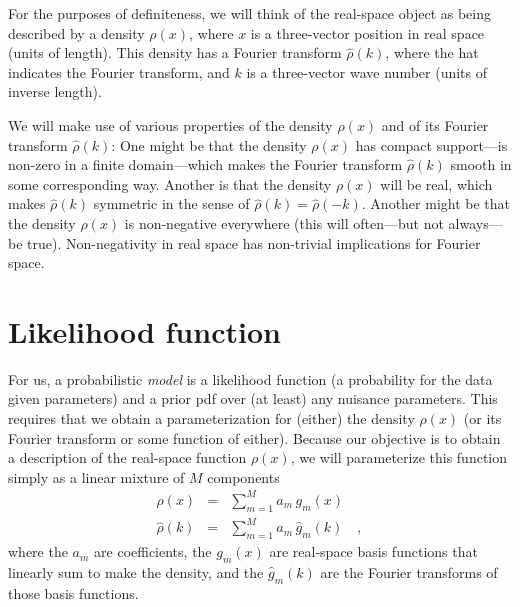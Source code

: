 \documentclass[12pt]{article}
\begin{document}
For the purposes of definiteness, we will think of the real-space
object as being described by a density $\rho(x)$, where $x$ is
a three-vector position in real space (units of length).
This density has a Fourier transform $\hat{\rho}(k)$, where the hat
indicates the Fourier transform, and $k$ is a three-vector wave number
(units of inverse length).

We will make use of various properties of the density $\rho(x)$ and of
its Fourier transform $\hat{\rho}(k)$:
One might be that the density $\rho(x)$ has compact support---is
non-zero in a finite domain---which makes the Fourier transform
$\hat{\rho}(k)$ smooth in some corresponding way.
Another is that the density $\rho(x)$ will be real, which makes
$\hat{\rho}(k)$ symmetric in the sense of
$\hat{\rho}(k)=\hat{\rho}(-k)$.
Another might be that the density $\rho(x)$ is non-negative everywhere
(this will often---but not always---be true).
Non-negativity in real space has non-trivial implications for Fourier
space.

\section{Likelihood function}

For us, a probabilistic \emph{model} is a likelihood function (a
probability for the data given parameters) and a prior pdf over (at
least) any nuisance parameters.
This requires that we obtain a parameterization for (either) the
density $\rho(x)$ (or its Fourier transform or some function of
either).
Because our objective is to obtain a description of the real-space
function $\rho(x)$, we will parameterize this function simply as a
linear mixture of $M$ components
\begin{eqnarray}
       \rho(x)  &=& \sum_{m=1}^M a_m\,     g_m(x)
  \\
  \hat{\rho}(k) &=& \sum_{m=1}^M a_m\,\hat{g}_m(k)
\quad ,
\end{eqnarray}
where the $a_m$ are coefficients, the $g_m(x)$ are real-space basis
functions that linearly sum to make the density, and the
$\hat{g}_m(k)$ are the Fourier transforms of those basis functions.
\end{document}
